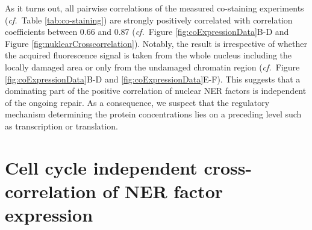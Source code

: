\noindent As it turns out, all pairwise correlations of the measured co-staining experiments (\textit{cf.}\ Table \ref{tab:co-staining}) are strongly positively correlated with correlation coefficients between 0.66 and 0.87 (\textit{cf.}\ Figure \ref{fig:coExpressionData}B-D and Figure \ref{fig:nuklearCrosscorrelation}). Notably, the result is irrespective of whether the acquired fluorescence signal is taken from the whole nucleus including the locally damaged area or only from the undamaged chromatin region (\textit{cf.}\ Figure \ref{fig:coExpressionData}B-D and \ref{fig:coExpressionData}E-F). This suggests that a dominating part of the positive correlation of nuclear NER factors is independent of the ongoing repair. As a consequence, we suspect that the regulatory mechanism determining the protein concentrations lies on a preceding level such as transcription or translation.\\  



\section {Cell cycle independent cross-correlation of NER factor expression}

